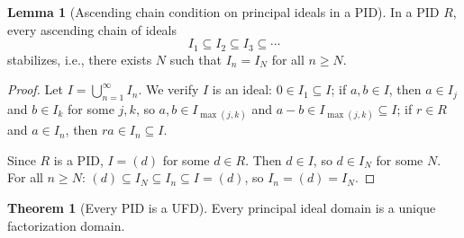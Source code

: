 \documentclass[12pt,a4paper,openany]{book}
\theoremstyle{definition}
\newtheorem{theorem}{Theorem}[chapter]
\newtheorem{lemma}{Lemma}[chapter]
\theoremstyle{remark}
\begin{document}
\begin{lemma}[Ascending chain condition on principal ideals in a PID]\label{lem:ACC-PID}
In a PID $R$, every ascending chain of ideals
\[
    I_1\subseteq I_2\subseteq I_3\subseteq\cdots
\]
stabilizes, i.e., there exists $N$ such that $I_n=I_N$ for all $n\geq N$.
\end{lemma}

\begin{proof}
Let $I=\bigcup_{n=1}^{\infty}I_n$. We verify $I$ is an ideal: $0\in I_1\subseteq I$; if $a,b\in I$, then $a\in I_j$ and $b\in I_k$ for some $j,k$, so $a,b\in I_{\max(j,k)}$ and $a-b\in I_{\max(j,k)}\subseteq I$; if $r\in R$ and $a\in I_n$, then $ra\in I_n\subseteq I$.

Since $R$ is a PID, $I=(d)$ for some $d\in R$. Then $d\in I$, so $d\in I_N$ for some $N$. For all $n\geq N$: $(d)\subseteq I_N\subseteq I_n\subseteq I=(d)$, so $I_n=(d)=I_N$.
\end{proof}

\begin{theorem}[Every PID is a UFD]\label{thm:PID-implies-UFD}
Every principal ideal domain is a unique factorization domain.
\end{theorem}
\end{document}
